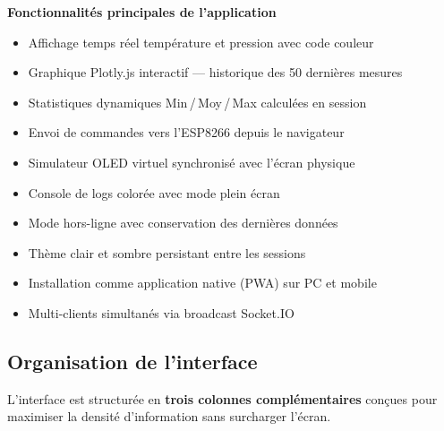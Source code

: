 \documentclass[a4paper,12pt]{article}
\begin{document}
\vspace{6pt}
\begin{center}
\begin{tcolorbox}[
  enhanced, colback=LightBlue!30, colframe=AccentBlue,
  boxrule=0.8pt, arc=4pt, width=0.92\textwidth,
]
\textbf{\color{PrimaryBlue}Fonctionnalit\'es principales de l'application}

\vspace{6pt}
\begin{itemize}[noitemsep, label=$\checkmark$,
  leftmargin=1.2em, itemsep=2pt]
  \item Affichage temps r\'eel temp\'erature et pression avec code couleur
  \item Graphique Plotly.js interactif --- historique des 50 derni\`eres mesures
  \item Statistiques dynamiques Min\,/\,Moy\,/\,Max calcul\'ees en session
  \item Envoi de commandes vers l'ESP8266 depuis le navigateur
  \item Simulateur OLED virtuel synchronis\'e avec l'\'ecran physique
  \item Console de logs color\'ee avec mode plein \'ecran
  \item Mode hors-ligne avec conservation des derni\`eres donn\'ees
  \item Th\`eme clair et sombre persistant entre les sessions
  \item Installation comme application native (PWA) sur PC et mobile
  \item Multi-clients simultan\'es via broadcast Socket.IO
\end{itemize}
\end{tcolorbox}
\end{center}

\subsection{Organisation de l'interface}

L'interface est structur\'ee en \textbf{trois colonnes compl\'ementaires} con\c{c}ues pour
maximiser la densit\'e d'information sans surcharger l'\'ecran.
\end{document}
